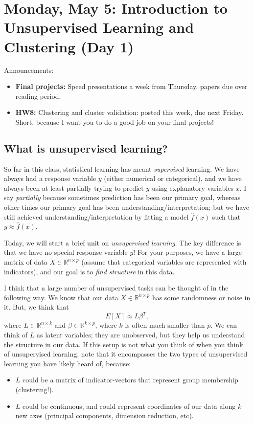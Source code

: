 \section{Monday, May 5: Introduction to Unsupervised Learning and Clustering (Day 1)}

Announcements:
\begin{itemize}
\item \textbf{Final projects:} Speed presentations a week from Thursday, papers due over reading period.
\item \textbf{HW8:} Clustering and cluster validation: posted this week, due next Friday. Short, because I want you to do a good job on your final projects!	
\end{itemize}


\subsection{What is unsupervised learning?}

So far in this class, statistical learning has meant \emph{supervised} learning. We have always had a response variable $y$ (either numerical or categorical), and we have always been at least partially trying to predict $y$ using explanatory variables $x$. I say \emph{partially} because sometimes prediction has been our primary goal, whereas other times our primary goal has been understanding/interpretation; but we have still achieved understanding/interpretation by fitting a model $\hat{f}(x)$ such that $y \approx \hat{f}(x)$. 


Today, we will start a brief unit on \emph{unsupervised learning}. The key difference is that we have no special response variable $y$! For your purposes, we have a large matrix of data $X \in \mathbb{R}^{n \times p}$ (assume that categorical variables are represented with indicators), and our goal is to \emph{find structure} in this data.

I think that a large number of unsupervised tasks can be thought of in the following way. We know that our data $X \in \mathbb{R}^{n \times p}$ has some randomness or noise in it. But, we think that
$$
E[X] \approx L \beta^T,
$$
where $L \in \mathbb{R}^{n \times k}$ and $\beta \in \mathbb{R}^{k \times p}$, where $k$ is often much smaller than $p$. We can think of $L$ as latent variables; they are unobserved, but they help us understand the structure in our data. If this setup is not what you think of when you think of unsupervised learning, note that it encompasses the two types of unsupervised learning you have likely heard of, because:
\begin{itemize}
\item $L$ could be a matrix of indicator-vectors that represent group membership (clustering!). 
\item $L$ could be continuous, and could represent coordinates of our data along $k$ new axes (principal components, dimension reduction, etc). 
\end{itemize}

